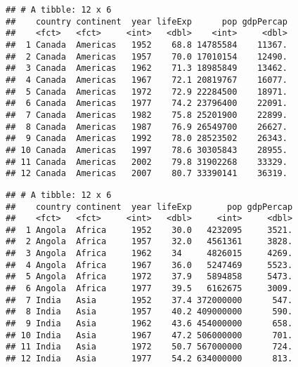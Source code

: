 \documentclass[]{article}
\newenvironment{Shaded}{\begin{snugshade}}{\end{snugshade}}
\newcommand{\DecValTok}[1]{\textcolor[rgb]{0.00,0.00,0.81}{#1}}
\newcommand{\KeywordTok}[1]{\textcolor[rgb]{0.13,0.29,0.53}{\textbf{#1}}}
\newcommand{\NormalTok}[1]{#1}
\newcommand{\OperatorTok}[1]{\textcolor[rgb]{0.81,0.36,0.00}{\textbf{#1}}}
\newcommand{\StringTok}[1]{\textcolor[rgb]{0.31,0.60,0.02}{#1}}
\begin{document}
\begin{Shaded}
\end{Shaded}

\begin{verbatim}
## # A tibble: 12 x 6
##    country continent  year lifeExp      pop gdpPercap
##    <fct>   <fct>     <int>   <dbl>    <int>     <dbl>
##  1 Canada  Americas   1952    68.8 14785584    11367.
##  2 Canada  Americas   1957    70.0 17010154    12490.
##  3 Canada  Americas   1962    71.3 18985849    13462.
##  4 Canada  Americas   1967    72.1 20819767    16077.
##  5 Canada  Americas   1972    72.9 22284500    18971.
##  6 Canada  Americas   1977    74.2 23796400    22091.
##  7 Canada  Americas   1982    75.8 25201900    22899.
##  8 Canada  Americas   1987    76.9 26549700    26627.
##  9 Canada  Americas   1992    78.0 28523502    26343.
## 10 Canada  Americas   1997    78.6 30305843    28955.
## 11 Canada  Americas   2002    79.8 31902268    33329.
## 12 Canada  Americas   2007    80.7 33390141    36319.
\end{verbatim}

\begin{Shaded}
\end{Shaded}

\begin{verbatim}
## # A tibble: 12 x 6
##    country continent  year lifeExp       pop gdpPercap
##    <fct>   <fct>     <int>   <dbl>     <int>     <dbl>
##  1 Angola  Africa     1952    30.0   4232095     3521.
##  2 Angola  Africa     1957    32.0   4561361     3828.
##  3 Angola  Africa     1962    34     4826015     4269.
##  4 Angola  Africa     1967    36.0   5247469     5523.
##  5 Angola  Africa     1972    37.9   5894858     5473.
##  6 Angola  Africa     1977    39.5   6162675     3009.
##  7 India   Asia       1952    37.4 372000000      547.
##  8 India   Asia       1957    40.2 409000000      590.
##  9 India   Asia       1962    43.6 454000000      658.
## 10 India   Asia       1967    47.2 506000000      701.
## 11 India   Asia       1972    50.7 567000000      724.
## 12 India   Asia       1977    54.2 634000000      813.
\end{verbatim}
\end{document}
